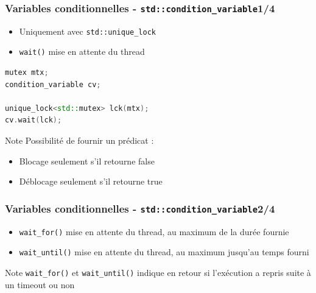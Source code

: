\documentclass[C++.tex]{subfiles}
\begin{document}
\begin{frame}[fragile]
	\frametitle{Variables conditionnelles - \lstinline|std::condition_variable|\titlehfill{}1/4}
	\begin{itemize}
		\item Uniquement avec \lstinline|std::unique_lock|
		\item \lstinline|wait()| mise en attente du thread
	\end{itemize}

	\begin{lstlisting}[language=C++]
mutex mtx;
condition_variable cv;

unique_lock<std::mutex> lck(mtx);
cv.wait(lck);\end{lstlisting}

	\begin{block}{Note}
		Possibilité de fournir un prédicat :
		\begin{itemize}
			\item Blocage seulement s'il retourne false
			\item Déblocage seulement s'il retourne true
		\end{itemize}
	\end{block}
\end{frame}

\begin{frame}[fragile]
	\frametitle{Variables conditionnelles - \lstinline|std::condition_variable|\titlehfill{}2/4}
	\begin{itemize}
		\item \lstinline|wait_for()| mise en attente du thread, au maximum de la durée fournie
		\item \lstinline|wait_until()| mise en attente du thread, au maximum jusqu'au temps fourni
	\end{itemize}

	\begin{block}{Note}
		\lstinline|wait_for()| et \lstinline|wait_until()| indique en retour si l'exécution a repris suite à un timeout ou non
	\end{block}
\end{frame}
\end{document}
